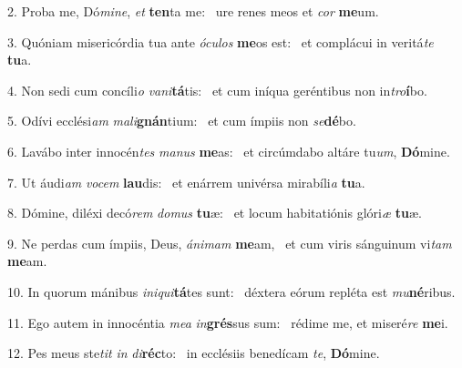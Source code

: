 2. Proba me, Dó\textit{mi}\textit{ne}, \textit{et} \textbf{ten}ta me: \ast\  ure renes meos et \textit{cor} \textbf{me}um.\

3. Quóniam misericórdia tua ante \textit{ó}\textit{cu}\textit{los} \textbf{me}os est: \ast\  et complácui in veritá\textit{te} \textbf{tu}a.\

4. Non sedi cum concíli\textit{o} \textit{va}\textit{ni}\textbf{tá}tis: \ast\  et cum iníqua geréntibus non in\textit{tro}\textbf{í}bo.\

5. Odívi ecclési\textit{am} \textit{ma}\textit{li}\textbf{gnán}tium: \ast\  et cum ímpiis non \textit{se}\textbf{dé}bo.\

6. Lavábo inter innocén\textit{tes} \textit{ma}\textit{nus} \textbf{me}as: \ast\  et circúmdabo altáre tu\textit{um}, \textbf{Dó}mine.\

7. Ut áudi\textit{am} \textit{vo}\textit{cem} \textbf{lau}dis: \ast\  et enárrem univérsa mirabíli\textit{a} \textbf{tu}a.\

8. Dómine, diléxi decó\textit{rem} \textit{do}\textit{mus} \textbf{tu}æ: \ast\  et locum habitatiónis glóri\textit{æ} \textbf{tu}æ.\

9. Ne perdas cum ímpiis, Deus, \textit{á}\textit{ni}\textit{mam} \textbf{me}am, \ast\  et cum viris sánguinum vi\textit{tam} \textbf{me}am.\

10. In quorum mánibus \textit{in}\textit{i}\textit{qui}\textbf{tá}tes sunt: \ast\  déxtera eórum repléta est \textit{mu}\textbf{né}ribus.\

11. Ego autem in innocéntia \textit{me}\textit{a} \textit{in}\textbf{grés}sus sum: \ast\  rédime me, et miseré\textit{re} \textbf{me}i.\

12. Pes meus ste\textit{tit} \textit{in} \textit{di}\textbf{réc}to: \ast\  in ecclésiis benedícam \textit{te}, \textbf{Dó}mine.\

